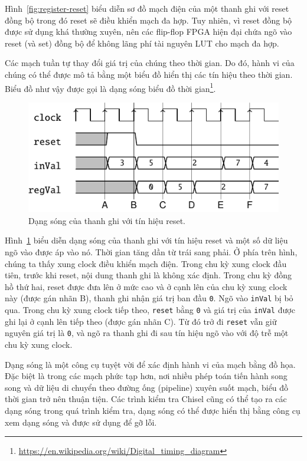 \documentclass[%
    10pt,
    headinclude, footexclude,
    openright, %
    notitlepage,
    cleardoubleempty,
    headsepline,
    pointlessnumbers,
    bibtotoc, idxtotoc,
    ]{scrbook}
\newcommand{\code}[1]{{\small{\texttt{#1}}}}
\newcommand{\todo}[1]{{\emph{TODO: #1}}}
\newcommand{\myref}[2]{\href{#1}{#2}}
\renewcommand{\myref}[2]{{#2}{\footnote{\url{#1}}}}
\renewcommand{\todo}[1]{}
\begin{document}
Hình~\ref{fig:register-reset} biểu diễn sơ đồ mạch điện của một thanh ghi với reset đồng bộ 
trong đó reset sẽ điều khiển mạch đa hợp. Tuy nhiên, vì reset đồng bộ được sử dụng khá thường 
xuyên, nên các flip-flop FPGA hiện đại chứa ngõ vào reset (và set) đồng bộ để không lãng phí tài 
nguyên LUT cho mạch đa hợp.

Các mạch tuần tự thay đổi giá trị của chúng theo thời gian. Do đó, hành vi của chúng có thể được 
mô tả bằng một biểu đồ hiển thị các tín hiệu theo thời gian. Biểu đồ như vậy được gọi là dạng sóng 
\myref{https://en.wikipedia.org/wiki/Digital_timing_diagram}{biểu đồ thời gian}.


\todo{from Luca: Do readers know about timing diagrams?}

\begin{figure}
  \centering
  \includegraphics[scale=1]{figures/reg_wave}
  \caption{Dạng sóng của thanh ghi với tín hiệu reset.}
  \label{fig:register-wave}
\end{figure}

Hình~\ref{fig:register-wave} biểu diễn dạng sóng của thanh ghi với tín hiệu reset
và một số dữ liệu ngõ vào được áp vào nó.
Thời gian tăng dần từ trái sang phải. Ở phía trên hình, chúng ta thấy xung clock điều khiển mạch điện. 
Trong chu kỳ xung clock đầu tiên, trước khi reset, nội dung thanh ghi là không xác định. Trong chu kỳ đồng hồ thứ hai, 
reset được đưa lên ở mức cao và ở cạnh lên của chu kỳ xung clock này (được gán nhãn B), thanh ghi nhận giá trị 
ban đầu \code{0}. Ngõ vào \code{inVal} bị bỏ qua. Trong chu kỳ xung clock tiếp theo, \code{reset} 
bằng \code{0} và giá trị của \code{inVal} được ghi lại ở cạnh lên tiếp theo (được gán nhãn C). 
Từ đó trở đi \code{reset} vẫn giữ nguyên giá trị là \code{0}, và ngõ ra thanh ghi đi sau tín hiệu ngõ vào với độ trễ một chu kỳ xung clock.

Dạng sóng là một công cụ tuyệt vời để xác định hành vi của mạch bằng đồ họa. 
Đặc biệt là trong các mạch phức tạp hơn, nơi nhiều phép toán tiến hành song song và 
dữ liệu di chuyển theo đường ống (pipeline) xuyên suốt mạch, biểu đồ thời gian trở nên thuận tiện.
Các trình kiểm tra Chisel cũng có thể tạo ra các dạng sóng trong quá trình kiểm tra, dạng sóng có 
thể được hiển thị bằng công cụ xem dạng sóng và được sử dụng để gỡ lỗi.
\end{document}
